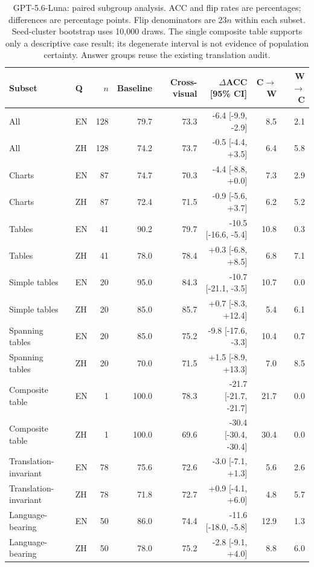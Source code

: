 \begin{table}[t]
\centering\scriptsize
\begin{tabular*}{\textwidth}{@{\extracolsep{\fill}}llrrrrrr@{}}
\toprule
Subset & Q & $n$ & Baseline & Cross-visual & $\Delta$ACC [95\% CI] & C$\to$W & W$\to$C \\
\midrule
All & EN & 128 & 79.7 & 73.3 & -6.4 [-9.9, -2.9] & 8.5 & 2.1 \\
All & ZH & 128 & 74.2 & 73.7 & -0.5 [-4.4, +3.5] & 6.4 & 5.8 \\
Charts & EN & 87 & 74.7 & 70.3 & -4.4 [-8.8, +0.0] & 7.3 & 2.9 \\
Charts & ZH & 87 & 72.4 & 71.5 & -0.9 [-5.6, +3.7] & 6.2 & 5.2 \\
Tables & EN & 41 & 90.2 & 79.7 & -10.5 [-16.6, -5.4] & 10.8 & 0.3 \\
Tables & ZH & 41 & 78.0 & 78.4 & +0.3 [-6.8, +8.5] & 6.8 & 7.1 \\
Simple tables & EN & 20 & 95.0 & 84.3 & -10.7 [-21.1, -3.5] & 10.7 & 0.0 \\
Simple tables & ZH & 20 & 85.0 & 85.7 & +0.7 [-8.3, +12.4] & 5.4 & 6.1 \\
Spanning tables & EN & 20 & 85.0 & 75.2 & -9.8 [-17.6, -3.3] & 10.4 & 0.7 \\
Spanning tables & ZH & 20 & 70.0 & 71.5 & +1.5 [-8.9, +13.3] & 7.0 & 8.5 \\
Composite table & EN & 1 & 100.0 & 78.3 & -21.7 [-21.7, -21.7] & 21.7 & 0.0 \\
Composite table & ZH & 1 & 100.0 & 69.6 & -30.4 [-30.4, -30.4] & 30.4 & 0.0 \\
Translation-invariant & EN & 78 & 75.6 & 72.6 & -3.0 [-7.1, +1.3] & 5.6 & 2.6 \\
Translation-invariant & ZH & 78 & 71.8 & 72.7 & +0.9 [-4.1, +6.0] & 4.8 & 5.7 \\
Language-bearing & EN & 50 & 86.0 & 74.4 & -11.6 [-18.0, -5.8] & 12.9 & 1.3 \\
Language-bearing & ZH & 50 & 78.0 & 75.2 & -2.8 [-9.1, +4.0] & 8.8 & 6.0 \\
\bottomrule\end{tabular*}
\caption{GPT-5.6-Luna: paired subgroup analysis. ACC and flip rates are percentages; differences are percentage points. Flip denominators are $23n$ within each subset. Seed-cluster bootstrap uses 10,000 draws. The single composite table supports only a descriptive case result; its degenerate interval is not evidence of population certainty. Answer groups reuse the existing translation audit.}
\end{table}
